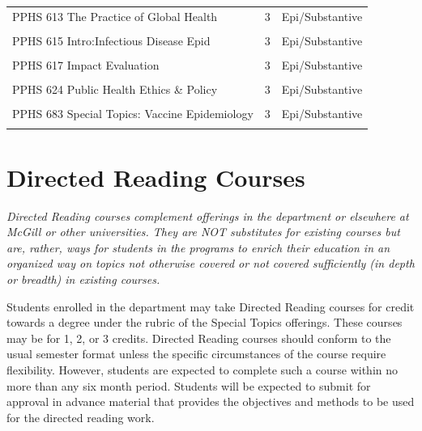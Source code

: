 \documentclass[
  openany]{book}
\begin{document}
\begin{table}
{\begin{tabular}[t]{l|r|l}
\hline
\cellcolor{gray!6}{PPHS 612 Principles/Pub Hlth Practice} & \cellcolor{gray!6}{3} & \cellcolor{gray!6}{Epi/Substantive}\\
\hline
PPHS 613 The Practice of Global Health & 3 & Epi/Substantive\\
\hline
\cellcolor{gray!6}{PPHS 614 Knowledge Translation and Public Health Leadership} & \cellcolor{gray!6}{3} & \cellcolor{gray!6}{Epi/Substantive}\\
\hline
PPHS 615 Intro:Infectious Disease Epid & 3 & Epi/Substantive\\
\hline
\cellcolor{gray!6}{PPHS 616 Principles \& Practice of Public Health Surveillance} & \cellcolor{gray!6}{3} & \cellcolor{gray!6}{Epi/Substantive}\\
\hline
PPHS 617 Impact Evaluation & 3 & Epi/Substantive\\
\hline
\cellcolor{gray!6}{PPHS 618 Program Planning and Evaluation in Public Health} & \cellcolor{gray!6}{3} & \cellcolor{gray!6}{Epi/Substantive}\\
\hline
PPHS 624 Public Health Ethics \& Policy & 3 & Epi/Substantive\\
\hline
\cellcolor{gray!6}{PPHS 682 Special Topics: Critical Perspectives on Global Health} & \cellcolor{gray!6}{2} & \cellcolor{gray!6}{Epi/Substantive}\\
\hline
PPHS 683 Special Topics: Vaccine Epidemiology & 3 & Epi/Substantive\\
\hline
\cellcolor{gray!6}{PPHS 684 Special Topics: Foundations of Health Promotion} & \cellcolor{gray!6}{3} & \cellcolor{gray!6}{Epi/Substantive}\\
\hline
\end{tabular}}
\end{table}

\hypertarget{directed-reading-courses}{%
\section{Directed Reading Courses}\label{directed-reading-courses}}

\emph{Directed Reading courses complement offerings in the department or elsewhere at McGill or other universities. They are NOT substitutes for existing courses but are, rather, ways for students in the programs to enrich their education in an organized way on topics not otherwise covered or not covered sufficiently (in depth or breadth) in existing courses.}

Students enrolled in the department may take Directed Reading courses for credit towards a degree under the rubric of the Special Topics offerings. These courses may be for 1, 2, or 3 credits. Directed Reading courses should conform to the usual semester format unless the specific circumstances of the course require flexibility. However, students are expected to complete such a course within no more than any six month period. Students will be expected to submit for approval in advance material that provides the objectives and methods to be used for the directed reading work.
\end{document}
